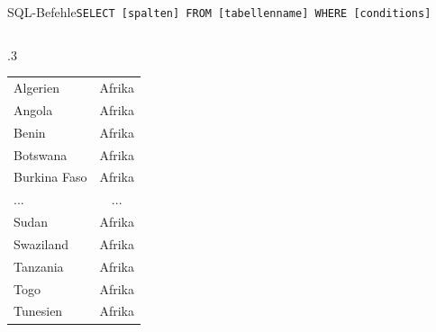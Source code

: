\begin{frame}[fragile]{SQL-Befehle}{\lstinline|SELECT [spalten] FROM [tabellenname] WHERE [conditions]|}
\begin{columns}[c]
\begin{column}{.3\textwidth}
\begin{table}
\begin{tabular}{lc}
          \midrule
          Algerien      & Afrika          \\
          Angola        & Afrika          \\
          Benin         & Afrika          \\
          Botswana      & Afrika          \\
          Burkina Faso  & Afrika          \\
          \midrule
          ...           & ...             \\
          \midrule
          Sudan         & Afrika          \\
          Swaziland     & Afrika          \\
          Tanzania      & Afrika          \\
          Togo          & Afrika          \\
          Tunesien      & Afrika          \\
          \bottomrule
        \end{tabular}
      \end{table}
    \end{column}
  \end{columns}
\end{frame}

